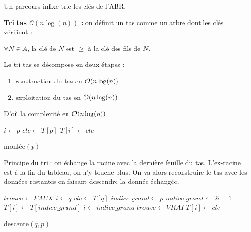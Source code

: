 \documentclass[a4paper, 8pt]{article}
\begin{document}
\begin{multicols*}{3}
Un parcours infixe trie les clés de l'ABR.

\medskip
\textbf{Tri tas $\mathcal{O}(n\log(n))$ :} on définit un tas comme un arbre dont les clés vérifient :
\begin{changemargin}{0.5cm}{0.5cm} 
\begin{center}
$\forall N\in A$, la clé de $N$ est $\geqslant$ à la clé des fils de $N$.
\end{center}
\end{changemargin}

Le tri tas se décompose en deux étapes :
\begin{enumerate}
\item construction du tas en $\mathcal{O}(n\log(n))$
\item exploitation du tas en $\mathcal{O}(n\log(n))$
\end{enumerate}

D'où la complexité en $\mathcal{O}(n\log(n))$.

\begin{algorithm}[H]
  $i \longleftarrow p$ \;
  $cle \longleftarrow T\left[p\right]$ \;
  	$T\left[i\right] \longleftarrow cle$ \;
 \caption{montée$(p)$}
\end{algorithm}

Principe du tri : on échange la racine avec la dernière feuille du tas. L'ex-racine est à la fin du tableau, on n'y touche plus. On va alors reconstruire le tas avec les données restantes en faisant descendre la donnée échangée.

\newcommand{\ig}{indice\_ grand}
\begin{algorithm}[H]
  $trouve \longleftarrow FAUX$ \;
  $i \longleftarrow q$ \;
  $cle \longleftarrow T\left[q\right]$ \;
  {
  	{$\ig \longleftarrow p$}{
  		{
  			$\ig \longleftarrow 2i+1$~\;
  		}
  	}
  	\eIf{$cle < T\left[\ig\right]$}
  	{
  		$T\left[i\right] \longleftarrow T\left[ \ig \right]$ \;
  		$i \longleftarrow \ig$ \;
  	}{
  	$trouve \longleftarrow VRAI$ \;
  	}
  }
  $T\left[i\right] \longleftarrow cle$ \;
 \caption{descente$(q,p)$}
\end{algorithm}


\end{multicols*}
\end{document}
